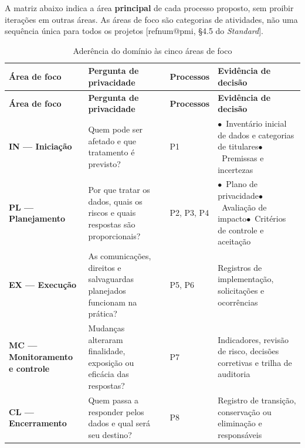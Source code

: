 \documentclass[11pt,a4paper]{article}
\makeatletter
\newcommand{\refnum}[1]{\csname refnum@#1\endcsname}
\newcommand{\SingleSpacing}{}
\newcommand{\fontetab}[1]{\par\vspace{3pt}{\small\noindent Fonte: #1\par}}
\makeatother
\begin{document}
A matriz abaixo indica a área \textbf{principal} de cada processo proposto, sem proibir iterações em outras áreas. As áreas de foco são categorias de atividades, não uma sequência única para todos os projetos [\refnum{pmi}, §4.5 do \textit{Standard}].

\begingroup\SingleSpacing\footnotesize
\begin{longtable}{@{}>{\raggedright\arraybackslash}p{}>{\raggedright\arraybackslash}p{}>{\raggedright\arraybackslash}p{}>{\raggedright\arraybackslash}p{}@{}}
\caption{Aderência do domínio às cinco áreas de foco}\label{tab:t8}\\
\toprule
\textbf{Área de foco} & \textbf{Pergunta de privacidade} & \textbf{Processos} & \textbf{Evidência de decisão}\\
\midrule
\endfirsthead
\toprule
\textbf{Área de foco} & \textbf{Pergunta de privacidade} & \textbf{Processos} & \textbf{Evidência de decisão}\\
\midrule
\endhead
\bottomrule
\endfoot
\bottomrule
\endlastfoot
\textbf{IN — Iniciação} & Quem pode ser afetado e que tratamento é previsto? & P1 & $\bullet$~Inventário inicial de dados e categorias de titulares\newline$\bullet$~Premissas e incertezas\\[3pt]
\textbf{PL — Planejamento} & Por que tratar os dados, quais os riscos e quais respostas são proporcionais? & P2, P3, P4 & $\bullet$~Plano de privacidade\newline$\bullet$~Avaliação de impacto\newline$\bullet$~Critérios de controle e aceitação\\[3pt]
\textbf{EX — Execução} & As comunicações, direitos e salvaguardas planejados funcionam na prática? & P5, P6 & Registros de implementação, solicitações e ocorrências\\[3pt]
\textbf{MC — Monitoramento e controle} & Mudanças alteraram finalidade, exposição ou eficácia das respostas? & P7 & Indicadores, revisão de risco, decisões corretivas e trilha de auditoria\\[3pt]
\textbf{CL — Encerramento} & Quem passa a responder pelos dados e qual será seu destino? & P8 & Registro de transição, conservação ou eliminação e responsáveis\\[3pt]
\end{longtable}
\endgroup
\fontetab{Elaborado pelos autores (2026).}
\end{document}
